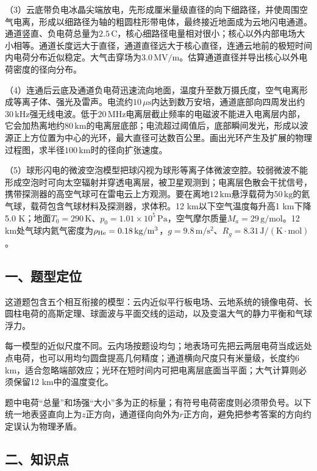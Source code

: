 \documentclass[12pt,a4paper,fontset=fandol]{ctexart}
\begin{document}
（3）云底带负电冰晶尖端放电，先形成厘米量级直径的向下细路径，并使周围空气电离，形成以细路径为轴的粗圆柱形带电体，最终接近地面成为云地闪电通道。通道竖直、负电荷总量为\(2.5\,\mathrm C\)，核心细路径电量相对很小；核心以外内部电场大小相等。通道长度远大于直径，通道直径远大于核心直径，连通云地前的极短时间内电荷分布近似稳定。大气击穿场为\(3.0\,\mathrm{MV/m}\)。估算通道直径并导出核心以外电荷密度的径向分布。

（4）连通后云底及通道负电荷迅速流向地面，温度升至数万摄氏度，空气电离形成等离子体、强光及雷声。电流约\(10\,\mu\mathrm s\)内达到数万安培，通道底部向四周发出约\(30\,\mathrm{kHz}\)强无线电波。低于\(20\,\mathrm{MHz}\)电离层截止频率的电磁波不能进入电离层内部，它会加热离地约\(80\,\mathrm{km}\)的电离层底部；电流超过阈值后，底部瞬间发光，形成以波源正上方位置为中心的光环，最大直径可达数百公里。画出光环产生及扩展的物理过程图，求半径\(100\,\mathrm{km}\)时的径向扩张速度。

（5）球形闪电的微波空泡模型把球闪视为球形等离子体微波空腔。较弱微波不能形成空泡时可向太空辐射并穿透电离层，被卫星观测到；电离层色散会干扰信号，携带探测器的高空气球可在雷电云上方观测。要在离地\(12\,\mathrm{km}\)悬浮载荷为\(50\,\mathrm{kg}\)的氦气球，载荷包含气球材料及探测器，求体积。12
km以下空气温度每升高1 km下降5.0
K；地面\(T_0=290\,\mathrm K\)、\(p_0=1.01\times10^5\,\mathrm{Pa}\)，空气摩尔质量\(M_a=29\,\mathrm{g/mol}\)。12
km处气球内氦气密度为\(\rho_{\rm He}=0.18\,\mathrm{kg/m^3}\)，\(g=9.8\,\mathrm{m/s^2}\)、\(R_g=8.31\,\mathrm{J/(K\cdot mol)}\)。

\subsection{一、题型定位}\label{ux4e00ux9898ux578bux5b9aux4f4d-6}

这道题包含五个相互衔接的模型：云内近似平行板电场、云地系统的镜像电荷、长圆柱电荷的高斯定理、球面波与平面交线的运动，以及变温大气的静力平衡和气球浮力。

每一模型的近似尺度不同。云内场按题设均匀；地表场可先把云两层电荷当成远处点电荷，也可以用均匀圆盘提高几何精度；通道横向尺度只有米量级，长度约6
km，适合忽略端部效应；光环在短时间内可把电离层底面当平面；大气计算则必须保留12
km中的温度变化。

题中电荷``总量''和场强``大小''多为正的标量；有符号电荷密度则必须带负号。以下统一地表竖直向上为\(z\)正方向，通道径向向外为\(r\)正方向，避免把参考答案的方向约定误认为物理矛盾。

\subsection{二、知识点}\label{ux4e8cux77e5ux8bc6ux70b9-6}
\end{document}
